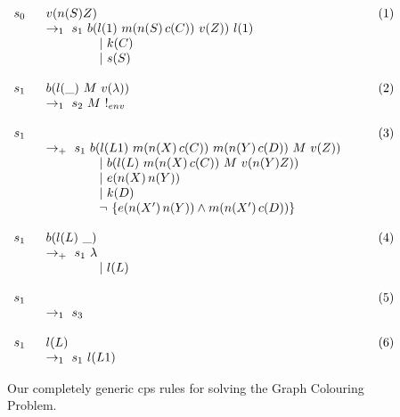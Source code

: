 \begin{figure}
\begin{framed}
\[\begin{array}{lllr}
s_0 ~ & ~ v(n(S)Z) ~ & ~ & (1) \\ & ~\rightarrow_1 ~ s_1 ~ b(l(1)~m(n(S)\,c(C))~v(Z)) ~ l(1)\\
    ~ & \hspace{1.5cm} ~ | ~ k(C) ~ & ~ \\
    ~ & \hspace{1.5cm} ~ | ~ s(S) ~ & ~ \\
    \\
s_1 ~ & ~ b(l(\_) ~ M ~ v(\lambda)) ~ & & ~ (2) \\ & ~ \rightarrow_1 ~ s_2 ~ M~!_{env} ~ &\\
    \\
s_1 ~ & ~  ~ & ~ & (3)  \\ & ~ \rightarrow_+ ~ s_1 ~ b(l(L1)~m(n(X)\,c(C))~m(n(Y)\,c(D))~M~v(Z))\\
    ~ & \hspace{1.5cm} ~ | ~ b(l(L)~m(n(X)\,c(C)) ~ M ~ v(n(Y)Z)) ~ & ~ \\
    ~ & \hspace{1.5cm} ~ | ~ e(n(X)\,n(Y)) ~ & ~ \\
    ~ & \hspace{1.5cm} ~ | ~ k(D) ~ & ~ \\
    ~ & \hspace{1.5cm} ~ \neg ~ \{ e(n(X')\,n(Y)) \land m(n(X')\,c(D)) \} ~ & ~ \\
    \\
s_1 ~ & ~ b(l(L)~\_) ~ & ~   ~ & ~ (4) \\ & ~ \rightarrow_+ ~ s_1 ~ \lambda\\
    ~ & \hspace{1.5cm} ~ | ~ l(L) ~ & ~ \\
    \\
s_1 ~ & ~  ~ & ~ & ~ (5)  \\ & ~ \rightarrow_1 ~ s_3 ~  ~ \\    
    \\
s_1 ~ & ~ l(L) ~ & ~  ~ & ~ (6)  \\ & ~ \rightarrow_1 ~ s_1 ~ l(L1)\\
\end{array}
\]
\end{framed}
\caption{Our completely generic \gls{cps} rules for solving the Graph Colouring Problem.}
\label{fig:rules}
\end{figure}

